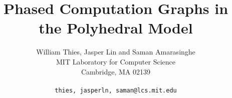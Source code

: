 \documentclass[10pt]{article}
\title{Phased Computation Graphs in the Polyhedral Model}
\author{William Thies, Jasper Lin and Saman Amarasinghe \\
  MIT Laboratory for Computer Science\\
  Cambridge, MA  02139\\ \\
  \texttt{\symbol{`\{}thies, jasperln, saman\symbol{`\}}@lcs.mit.edu}}
\date{}
\begin{document}
  \maketitle

  \newcommand{\mt}[1]{\mbox{\it #1}}
  \newcommand{\todo}[1]{\framebox{\bf #1}}
  \newcommand{\dep}[0]{Dependence Frontier}                %
  \newcommand{\DP}[0]{\textsc{Frontier}}                   %
  \newcommand{\DEP}[2]{\DP_{#1 \small{\rightarrow} #2}}    %

  \begin{abstract}
    
  \end{abstract}

%  
  
  
  
  
  
  
  

  \begin{small}
    \begin{singlespace}
      
      
    \end{singlespace}
  \end{small}

  
  
\end{document}
